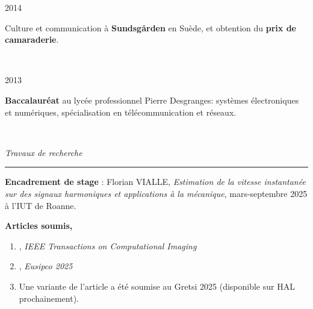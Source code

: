 {	\noindent
	\begin{minipage}{0.20\textwidth}
		\color{MyGray} 2014
	\end{minipage}
	\hfill
	\begin{minipage}{0.70\textwidth}
		Culture et communication à \textbf{Sundsgården} en Suède, et obtention du \textbf{prix de camaraderie}.
	\end{minipage}\\
	\vspace{2mm}
	
	\noindent
	\begin{minipage}{0.20\textwidth}
		\color{MyGray} 2013
	\end{minipage}
	\hfill
	\begin{minipage}{0.70\textwidth}
		\textbf{Baccalauréat} au lycée professionnel Pierre Desgranges: systèmes électroniques et numériques, spécialisation en télécommunication et réseaux.
	\end{minipage}\\
	\vspace{5mm}
	
	\noindent
	\textit{\Large \color{MyGray} \hspace{5mm} Travaux de recherche}
	\vspace{2mm}
	{\color{DefaultGray}\hrule height .1pt}
	\vspace{4mm}
	
	\vspace{5mm}
	
	\textbf{Encadrement de stage} : Florian VIALLE, \textit{Estimation de la vitesse instantanée sur des signaux harmoniques et applications à la mécanique}, mars-septembre 2025 à l'IUT de Roanne.
	
	\vspace{5mm}
	
	\textbf{Articles soumis,}
	\begin{enumerate}
		\item {}, \textit{IEEE Transactions on Computational Imaging}
		\item {}, \textit{Eusipco 2025}
		\item Une variante de l'article  a été soumise au Gretsi 2025 (disponible sur HAL prochainement).
	\end{enumerate}
	
	\vspace{5mm}
	
}
